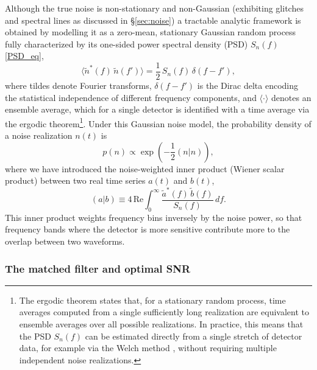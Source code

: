 Although the true noise is non-stationary and non-Gaussian (exhibiting glitches and spectral lines as discussed in 
\S\ref{sec:noise}) a tractable analytic framework is obtained by modelling it as a zero-mean, stationary Gaussian random process fully characterized by its one-sided power spectral density (PSD) 
$S_n(f)$ \eqref{PSD_eq},
\begin{equation}
    \langle \tilde{n}^*(f)\,\tilde{n}(f') \rangle 
    = \frac{1}{2}\,S_n(f)\,\delta(f - f'),
    \label{eq:PSD}
\end{equation}
where tildes denote Fourier transforms, $\delta(f-f')$ is the Dirac delta encoding the statistical independence of different frequency components, and $\langle\cdot\rangle$ denotes an ensemble average, which for a single detector is identified with a time average via the ergodic theorem\footnote{The ergodic theorem states that, for a stationary random process, time averages computed from a single sufficiently long realization are equivalent to ensemble averages over all possible realizations. In practice, this means that the PSD $S_n(f)$ can be 
estimated directly from a single stretch of detector data, for example via the Welch method \cite{welch_method}, without requiring multiple independent noise realizations.}. Under this Gaussian noise model, the probability density of a noise realization $n(t)$ is
\begin{equation}
    p(n) \propto \exp\!\left(-\frac{1}{2}(n|n)\right),
\end{equation}
where we have introduced the noise-weighted inner product (Wiener scalar product) between two real time series $a(t)$ and 
$b(t)$,
\begin{equation}
    (a|b) \equiv 4\,\mathrm{Re}\int_0^\infty 
    \frac{\tilde{a}^*(f)\,\tilde{b}(f)}{S_n(f)}\,df.
    \label{eq:inner_product}
\end{equation}
This inner product weights frequency bins inversely by the noise power, so that frequency bands where the detector is more sensitive contribute more to the overlap between two waveforms.

\subsubsection{The matched filter and optimal SNR}

